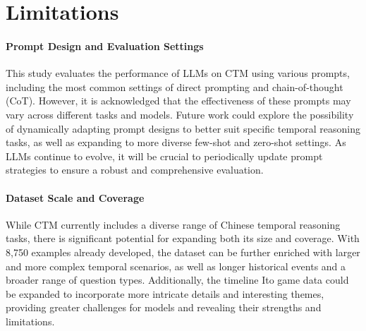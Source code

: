 \section*{Limitations}

\paragraph{Prompt Design and Evaluation Settings}
This study evaluates the performance of LLMs on CTM using various prompts, including the most common settings of direct prompting and chain-of-thought (CoT).
However, it is acknowledged that the effectiveness of these prompts may vary across different tasks and models.
Future work could explore the possibility of dynamically adapting prompt designs to better suit specific temporal reasoning tasks, as well as expanding to more diverse few-shot and zero-shot settings.
As LLMs continue to evolve, it will be crucial to periodically update prompt strategies to ensure a robust and comprehensive evaluation.

\paragraph{Dataset Scale and Coverage}
While CTM currently includes a diverse range of Chinese temporal reasoning tasks, there is significant potential for expanding both its size and coverage.
With 8,750 examples already developed, the dataset can be further enriched with larger and more complex temporal scenarios, as well as longer historical events and a broader range of question types.
Additionally, the timeline Ito game data could be expanded to incorporate more intricate details and interesting themes, providing greater challenges for models and revealing their strengths and limitations.
